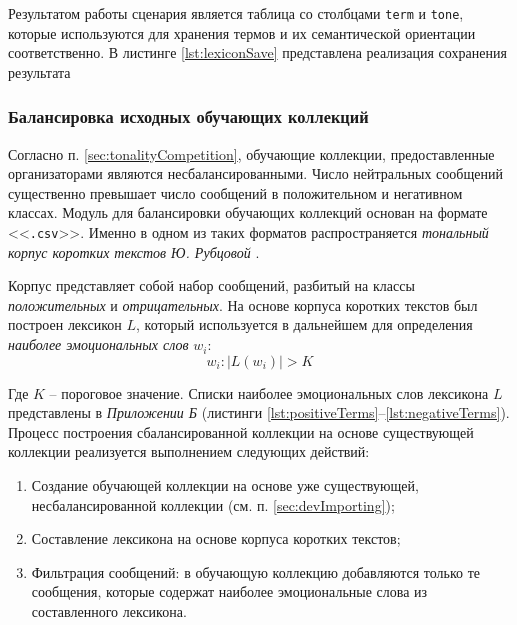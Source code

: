     \lstset{style=python}
    

        Результатом работы сценария является таблица со столбцами {\tt term}
    и {\tt tone}, которые используются для хранения термов и их семантической
    ориентации соответственно.
    В листинге \ref{lst:lexiconSave} представлена реализация сохранения результата

    \lstset{style=python}
    

    \subsubsection{Балансировка исходных обучающих коллекций}
    Согласно п. \ref{sec:tonalityCompetition}, обучающие коллекции,
    предоставленные организаторами являются несбалансированными.
    Число нейтральных сообщений существенно превышает число
    сообщений в положительном и негативном классах.
    Модуль для балансировки обучающих коллекций основан на формате <<{\tt .csv}>>.
    Именно в одном из таких форматов распространяется {\it тональный корпус коротких
    текстов Ю. Рубцовой} \cite{rubtsovaCollection}.

    Корпус представляет собой набор сообщений, разбитый на классы
    {\it положительных} и {\it отрицательных}.
    На основе корпуса коротких текстов был построен лексикон $L$, который
    используется в дальнейшем для определения {\it наиболее эмоциональных слов}
    $w_i$:
    \begin{equation}
        w_i : |L(w_i)| > K
    \end{equation}

    Где $K$ -- пороговое значение.
    Списки наиболее эмоциональных слов лексикона $L$ представлены в
    {\it Приложении Б } (листинги \ref{lst:positiveTerms}--\ref{lst:negativeTerms}).
    Процесс построения сбалансированной коллекции на основе существующей
    коллекции реализуется выполнением следующих действий:
    \begin{enumerate}
        \item Создание обучающей коллекции на основе уже существующей,
            несбалансированной коллекции (см. п. \ref{sec:devImporting});
        \item Составление лексикона на основе корпуса коротких текстов;
        \item Фильтрация сообщений: в обучающую коллекцию добавляются
            только те сообщения, которые содержат наиболее эмоциональные слова
            из составленного лексикона.
    \end{enumerate}


